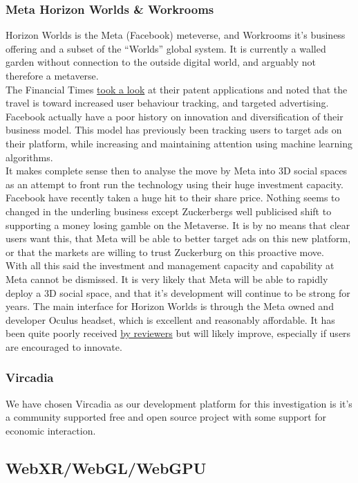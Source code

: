 \subsubsection{Meta Horizon Worlds \& Workrooms}
Horizon Worlds is the Meta (Facebook) meteverse, and Workrooms it's business offering and a subset of the ``Worlds'' global system. It is currently a walled garden without connection to the outside digital world, and arguably not therefore a metaverse.\\
The Financial Times \href{}{took a look} at their patent applications and noted that the travel is toward increased user behaviour tracking, and targeted advertising.\\
Facebook actually have a poor history on innovation and diversification of their business model. This model has previously been tracking users to target ads on their platform, while increasing and maintaining attention using machine learning algorithms. \\
It makes complete sense then to analyse the move by Meta into 3D social spaces as an attempt to front run the technology using their huge investment capacity. Facebook have recently taken a huge hit to their share price. Nothing seems to changed in the underling business except Zuckerbergs well publicised shift to supporting a money losing gamble on the Metaverse. It is by no means that clear users want this, that Meta will be able to better target ads on this new platform, or that the markets are willing to trust Zuckerburg on this proactive move. \\
With all this said the investment and management capacity and capability at Meta cannot be dismissed. It is very likely that Meta will be able to rapidly deploy a 3D social space, and that it's development will continue to be strong for years. The main interface for Horizon Worlds is through the Meta owned and developer Oculus headset, which is excellent and reasonably affordable. It has been quite poorly received \href{https://kotaku.com/facebook-metaverse-horizon-worlds-vr-oculus-quest-2-cha-1848436740}{by reviewers} but will likely improve, especially if users are encouraged to innovate.
\subsubsection{Vircadia}
We have chosen Vircadia as our development platform for this investigation is it's a community supported free and open source project with some support for economic interaction.
\subsection{WebXR/WebGL/WebGPU}
